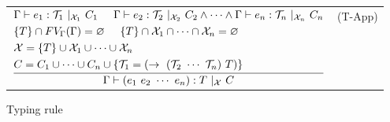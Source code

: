 \documentclass{article}
\begin{document}
\begin{figure}
\begin{tabular}{rlrl}
        \multicolumn{3}{r}{
        $\dfrac{\begin{aligned}
        &\Gamma \vdash e_1 : \mathcal{T}_1\ |_{\mathcal{X}_1}\ C_1 \hspace{5mm}
        \Gamma \vdash e_2 : \mathcal{T}_2\ |_{\mathcal{X}_2}\ C_2 \land \cdots \land \Gamma \vdash e_n : \mathcal{T}_n\ |_{\mathcal{X}_n}\ C_n \\
        &\{T\} \cap FV_\Gamma(\Gamma) = \varnothing \hspace{5mm} \{T\} \cap \mathcal{X}_1 \cap \cdots \cap \mathcal{X}_n = \varnothing\\
        &\mathcal{X} = \{T\} \cup \mathcal{X}_1 \cup \cdots \cup \mathcal{X}_n \\
        &C = C_1 \cup \cdots \cup C_n \cup \{ \mathcal{T}_1 = (\rightarrow\ (\mathcal{T}_2\ \cdots\ \mathcal{T}_n)\ T) \}
        \end{aligned}}{\Gamma \vdash (e_1\ e_2\ \cdots\ e_n) : T\ |_\mathcal{X}\ C}$} & (T-App) \vspace{5mm} \\
    \end{tabular}
    \caption{Typing rule}
\end{figure}
\end{document}
